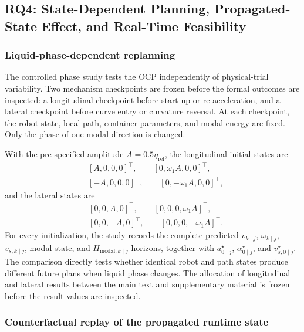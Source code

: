 \subsection{RQ4: State-Dependent Planning, Propagated-State Effect, and Real-Time Feasibility}
\label{sec:rq4}

\subsubsection{Liquid-phase-dependent replanning}

The controlled phase study tests the OCP independently of physical-trial
variability. Two mechanism checkpoints are frozen before the formal outcomes
are inspected: a longitudinal checkpoint before start-up or re-acceleration,
and a lateral checkpoint before curve entry or curvature reversal. At each
checkpoint, the robot state, local path, container parameters, and modal energy
are fixed. Only the phase of one modal direction is changed.

With the pre-specified amplitude $A=0.5\eta_{\mathrm{ref}}$, the longitudinal
initial states are
\begin{equation}
\begin{aligned}
  &[A,0,0,0]^\top,\qquad
  [0,\omega_1A,0,0]^\top,\\
  &[-A,0,0,0]^\top,\qquad
  [0,-\omega_1A,0,0]^\top,
\end{aligned}
\label{eq:phase_initial_states}
\end{equation}
and the lateral states are
\begin{equation}
\begin{aligned}
  &[0,0,A,0]^\top,\qquad
  [0,0,0,\omega_1A]^\top,\\
  &[0,0,-A,0]^\top,\qquad
  [0,0,0,-\omega_1A]^\top.
\end{aligned}
\label{eq:lateral_phase_initial_states}
\end{equation}
For every initialization, the study records the complete predicted
$v_{k\mid j}$, $\omega_{k\mid j}$, $v_{s,k\mid j}$, modal-state, and
$H_{\mathrm{modal},k\mid j}$ horizons, together with
$a_{0\mid j}^{\star}$, $\alpha_{0\mid j}^{\star}$, and
$v_{s,0\mid j}^{\star}$. The comparison directly tests whether identical
robot and path states produce different future plans when liquid phase changes.
The allocation of longitudinal and lateral results between the main text and
supplementary material is frozen before the result values are inspected.

\subsubsection{Counterfactual replay of the propagated runtime state}

